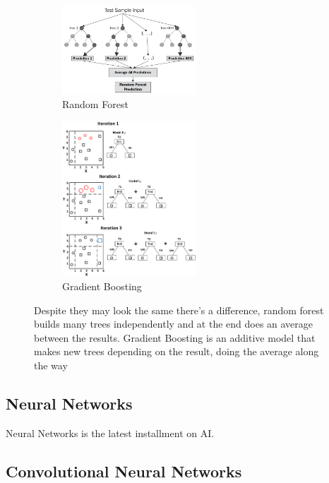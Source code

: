 \documentclass[openany]{article}
\begin{document}
\begin{figure}[ht]
\begin{subfigure}
  \centering
  \includegraphics[width=5cm]{random-forest.png}  
  \caption{Random Forest}
  \label{fig:sub-first}
\end{subfigure}
\begin{subfigure}
  \centering
  \includegraphics[width=5cm]{A-simple-example-of-visualizing-gradient-boosting.png}  
  \caption{Gradient Boosting}
  \label{fig:sub-second}
\end{subfigure}
\caption{Despite they may look the same there's a difference, random forest builds many trees independently and at the end does an average between the results. Gradient Boosting is an additive model that makes new trees depending on the result, doing the average along the way}
\label{fig:fig}
\end{figure}



\subsection{Neural Networks}

Neural Networks is the latest installment on AI. 


\subsection{Convolutional Neural Networks}
\newpage


\newpage


\newpage

\newpage

\newpage

\newpage

\printbibliography

\newpage
\end{document}
